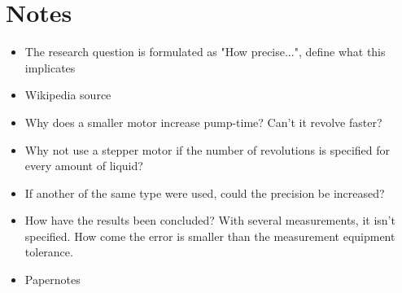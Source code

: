 \documentclass{article}
\begin{document}
\section{Notes}

\begin{itemize}
\item The research question is formulated as "How precise...", define what this implicates

\item Wikipedia source

\item Why does a smaller motor increase pump-time? Can't it revolve faster? 

\item Why not use a stepper motor if the number of revolutions is specified for every amount of liquid?

\item If another of the same type were used, could the precision be increased?

\item How have the results been concluded? With several measurements, it isn't specified. How come the error is smaller than the measurement equipment tolerance. 

\item Papernotes
	
\end{itemize}
\end{document}
